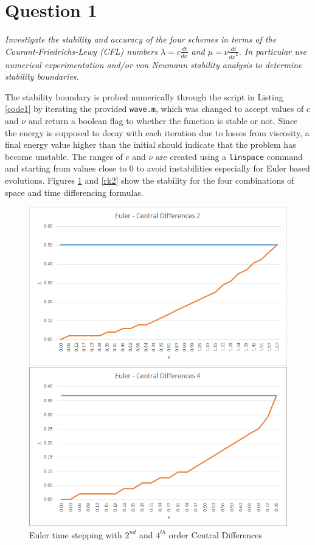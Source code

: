 \section*{Question 1}
\emph{Investigate the stability and accuracy of the four schemes in terms of the Courant-Friedrichs-Lewy (CFL) numbers $\lambda = c \tfrac{dt}{dx}$ and $\mu = \nu \tfrac{dt}{{dx}^2}$. In particular use numerical experimentation and/or von Neumann stability analysis to determine stability boundaries.}



The stability boundary is probed numerically through the script in Listing \ref{code1} by iterating the provided \texttt{wave.m}, which was changed to accept values of $c$ and $\nu$ and return a boolean flag to whether the function is stable or not. Since the energy is supposed to decay with each iteration due to losses from viscosity, a final energy value higher than the initial should indicate that the problem has become unstable. The ranges of $c$ and $\nu$ are created using a \texttt{linspace} command and starting from values close to $0$ to avoid instabilities especially for Euler based evolutions. Figures \ref{euler} and \ref{rk2} show the stability for the four combinations of space and time differencing formulas.

\begin{figure}[ht!]
\centering
\includegraphics[scale=0.8]{./TEXT/Euler.png}
\caption{Euler time stepping with $2^{nd}$ and $4^{th}$ order Central Differences}
\label{euler}
\end{figure}

